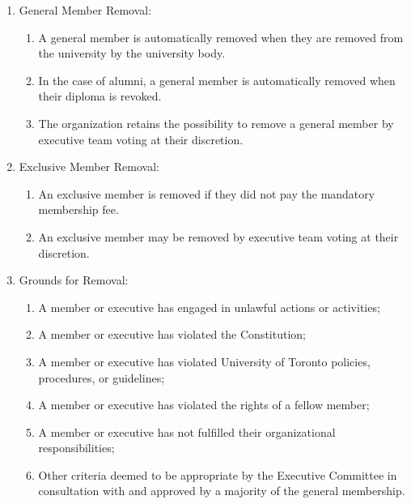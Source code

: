 \documentclass[12pt,a4paper]{article}
\begin{document}
\begin{enumerate}
\item General Member Removal:

\begin{enumerate}
\item A general member is automatically removed when they are removed from the university by the university body.

\item In the case of alumni, a general member is automatically removed when their diploma is revoked.

\item The organization retains the possibility to remove a general member by executive team voting at their discretion.
\end{enumerate}

\item Exclusive Member Removal:

\begin{enumerate}
\item An exclusive member is removed if they did not pay the mandatory membership fee.

\item An exclusive member may be removed by executive team voting at their discretion.
\end{enumerate}

\item Grounds for Removal:

\begin{enumerate}
\item A member or executive has engaged in unlawful actions or activities;

\item A member or executive has violated the Constitution;

\item A member or executive has violated University of Toronto policies, procedures, or guidelines;

\item A member or executive has violated the rights of a fellow member;

\item A member or executive has not fulfilled their organizational responsibilities;

\item Other criteria deemed to be appropriate by the Executive Committee in consultation with and approved by a majority of the general membership.
\end{enumerate}


\end{enumerate}
\end{document}

